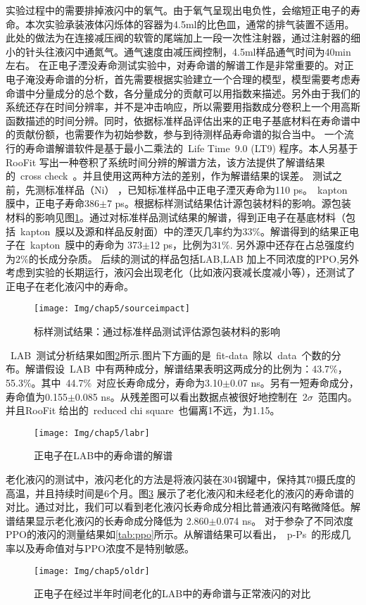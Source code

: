 实验过程中的需要排掉液闪中的氧气。由于氧气呈现出电负性，会缩短正电子的寿命。本次实验承装液体闪烁体的容器为4.5ml的比色皿，通常的排气装置不适用。此处的做法为在连接减压阀的软管的尾端加上一段一次性注射器，通过注射器的细小的针头往液闪中通氮气。通气速度由减压阀控制，4.5ml样品通气时间为40min左右。
在正电子湮没寿命测试实验中，对寿命谱的解谱工作是非常重要的。对正电子淹没寿命谱的分析，首先需要根据实验建立一个合理的模型，模型需要考虑寿命谱中分量成分的总个数，各分量成分的贡献可以用指数来描述。另外由于我们的系统还存在时间分辨率，并不是冲击响应，所以需要用指数成分卷积上一个用高斯函数描述的时间分辨。同时，依据标准样品评估出来的正电子基底材料在寿命谱中的贡献份额，也需要作为初始参数，参与到待测样品寿命谱的拟合当中。
一个流行的寿命谱解谱软件是基于最小二乘法的~Life Time~9.0 (LT9) 程序\citep{kansy1996microcomputer}。本人另基于RooFit 写出一种卷积了系统时间分辨的解谱方法，该方法提供了解谱结果的~cross check~。并且使用这两种方法的差别，作为解谱结果的误差。
测试之前，先测标准样品（Ni） ，已知标准样品中正电子湮灭寿命为110 ps\citep{zhang2015accurate}。~kapton~ 膜中，正电子寿命386$\pm$7 ps\citep{plotkowski1988positron}。根据标样测试结果估计源包装材料的影响。源包装材料的影响见图\ref{fig:p55}。通过对标准样品测试结果的解谱，得到正电子在基底材料（包括~kapton~膜以及源和样品反射面）中的湮灭几率约为$33\%$。解谱得到的结果正电子在~kapton~膜中的寿命为 373$\pm$12 ps，比例为$31\%$. 另外源中还存在占总强度约为$2\%$的长成分杂质。
后续的测试的样品包括LAB,LAB 加上不同浓度的PPO,另外考虑到实验的长期运行，液闪会出现老化（比如液闪衰减长度减小等），还测试了正电子在老化液闪中的寿命。
\begin{figure}[!htbp]
  \centering
   \texttt{[image: Img/chap5/sourceimpact]}
    \caption{标样测试结果：通过标准样品测试评估源包装材料的影响}
  \label{fig:p55}
\end{figure}
~LAB~测试分析结果如图\ref{fig:labs}所示.图片下方画的是~fit-data~除以~data~个数的分布。解谱假设~LAB~中有两种成分，解谱结果表明这两成分的比例为：43.7\%，55.3\%。其中~44.7\%~对应长寿命成分，寿命为3.10$\pm$0.07 ns。另有一短寿命成分，寿命值为0.155$\pm$0.085 ns。从残差图可以看出数据点被很好地控制在~2$\sigma$~范围内。并且RooFit 给出的~reduced chi square~也偏离1不远，为1.15。
\begin{figure}[!htbp]
  \centering
   \texttt{[image: Img/chap5/labr]}
    \caption{正电子在LAB中的寿命谱的解谱}
  \label{fig:labs}
\end{figure}
老化液闪的测试中，液闪老化的方法是将液闪装在304钢罐中，保持其70摄氏度的高温，并且持续时间是6个月。图\ref{fig:oldrf} 展示了老化液闪和未经老化的液闪的寿命谱的对比。通过对比，我们可以看到老化液闪长寿命成分相比普通液闪有略微降低。解谱结果显示老化液闪的长寿命成分降低为 2.860$\pm$0.074 ns。 对于参杂了不同浓度PPO的液闪的测量结果如\ref{tab:ppo}所示。从解谱结果可以看出，~p-Ps~的形成几率以及寿命值对与PPO浓度不是特别敏感。
\begin{figure}[!htbp]
  \centering
   \texttt{[image: Img/chap5/oldr]}
    \caption{正电子在经过半年时间老化的LAB中的寿命谱与正常液闪的对比}
  \label{fig:oldrf}
\end{figure}

